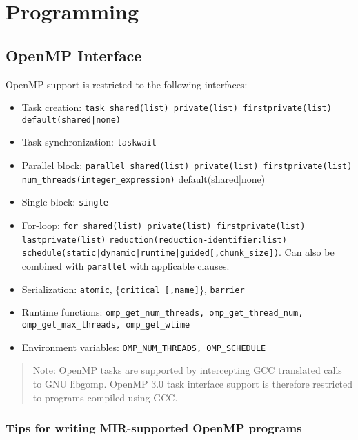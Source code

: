 \documentclass[11pt,a4paper]{article}
\begin{document}
\section{Programming}\label{programming}

\subsection{OpenMP Interface}\label{openmp-interface}

OpenMP support is restricted to the following interfaces:

\begin{itemize}
    \item Task creation: \texttt{task shared(list) private(list) firstprivate(list) default(shared|none)}
    \item Task synchronization: \texttt{taskwait}
    \item Parallel block: \texttt{parallel shared(list) private(list) firstprivate(list) num\_threads(integer\_expression)} default(shared|none)
    \item Single block: \texttt{single}
    \item For-loop: \texttt{for shared(list) private(list) firstprivate(list) lastprivate(list)} \texttt{reduction(reduction-identifier:list)} \\ \texttt{schedule(static|dynamic|runtime|guided[,chunk\_size])}. Can also be combined with \texttt{parallel} with applicable clauses.
    \item Serialization: \texttt{atomic}, \{\texttt{critical [,name]}\}, \texttt{barrier}
    \item Runtime functions: \texttt{omp\_get\_num\_threads, omp\_get\_thread\_num, \\omp\_get\_max\_threads, omp\_get\_wtime}
    \item Environment variables: \texttt{OMP\_NUM\_THREADS, OMP\_SCHEDULE}
\end{itemize}

\begin{framed}
\begin{quote}
Note: OpenMP tasks are supported by intercepting GCC translated calls to GNU libgomp. OpenMP 3.0 task interface support is therefore restricted to programs compiled using GCC.
\end{quote}
\end{framed}

\subsubsection{Tips for writing MIR-supported OpenMP programs}\label{tips-for-writing-mir-supported-openmp-programs}
\end{document}
